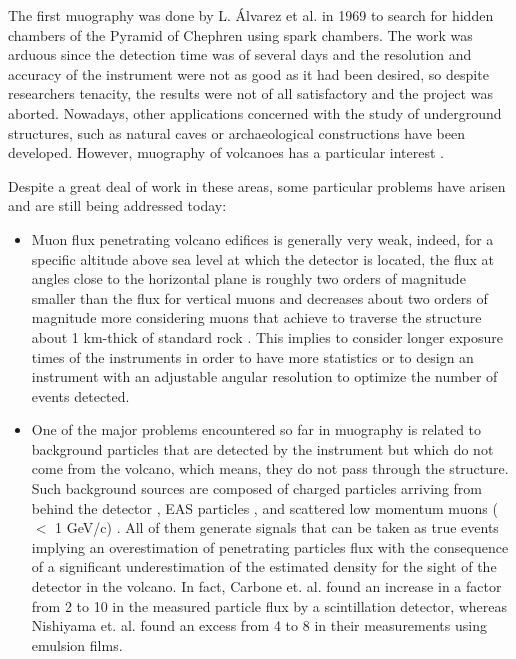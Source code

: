 \documentclass[letterpaper,11pt]{article}
\begin{document}
The first muography was done by L. \'Alvarez et al. \cite{Alvarez1970} in 1969 to search for hidden chambers of the Pyramid of Chephren using spark chambers. The work was arduous since the detection time was of several days and the resolution and accuracy of the instrument were not as good as it had been desired, so despite researchers tenacity, the results were not of all satisfactory and the project was aborted. Nowadays, other applications concerned with the study of underground structures, such as natural caves \cite{caffau1997underground} or archaeological constructions \cite{basset2006mgr,menichelli2007scintillating} have been developed. However, muography of volcanoes has a particular interest \cite{tanaka2013subsurface,saracino2012looking,marteau2012muons,okubo2012imaging,lesparre2010geophysical,tanaka2007high}.

Despite a great deal of work in these areas, some particular problems have arisen and are still being addressed today:
\begin{itemize}

\item Muon flux penetrating volcano edifices is generally very weak, indeed, for a specific altitude above sea level at which the detector is located, the flux at angles close to the horizontal plane is roughly two orders of magnitude smaller than the flux for vertical muons and decreases about two orders of magnitude more considering muons that achieve to traverse the structure about 1 km-thick of standard rock \cite{groom2001muon, groom2000passage}. This implies to consider longer exposure times of the instruments in order to have more statistics or to design an instrument with an adjustable angular resolution to optimize the number of events detected.

\item One of the major problems encountered so far in muography is related to background particles that are detected by the instrument but which do not come from the volcano, which means, they do not pass through the structure. Such background sources are composed of charged particles arriving from behind the detector \cite{jourde2013experimental}, EAS particles \cite{nishiyama2014experimental, Olah2017ICRC, KUSAGAYA2015, Bene2013, Olh2017}, and scattered low momentum muons ($<$ 1 GeV/c) \cite{nishiyama2016monte, Gomez2017, Olh2018, Olah2018Invest, ambrosino2015joint}. All of them generate signals that can be taken as true events implying an overestimation of penetrating particles flux with the consequence of a significant underestimation of the estimated density for the sight of the detector in the volcano. In fact, Carbone et. al. \cite{carbone2013experiment} found an increase in a factor from 2 to 10 in the measured particle flux by a scintillation detector, whereas Nishiyama et. al. \cite{nishiyama2016monte} found an excess from 4 to 8 in their measurements using emulsion films.
\end{itemize}
\end{document}
